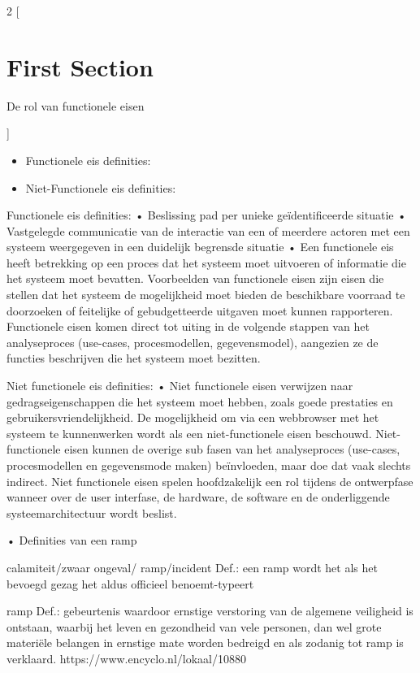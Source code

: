 \documentclass[a4paper,12pt]{article}
\begin{document}
\begin{multicols}{2}
[
\section{First Section}
De rol van functionele eisen

]

\begin{itemize}
  \item Functionele eis definities:
  \item Niet-Functionele eis definities:
\end{itemize}
Functionele eis definities:
•	Beslissing pad per unieke geïdentificeerde situatie
•	Vastgelegde communicatie van de interactie van een of meerdere actoren met een systeem weergegeven in een duidelijk begrensde situatie
•	Een functionele eis heeft betrekking op een proces dat het systeem moet uitvoeren of informatie die het systeem moet bevatten. Voorbeelden van functionele eisen zijn eisen die stellen dat het systeem de mogelijkheid moet bieden de beschikbare voorraad te doorzoeken of feitelijke of gebudgetteerde uitgaven moet kunnen rapporteren. Functionele eisen komen direct tot uiting in de volgende stappen van het analyseproces (use-cases, procesmodellen, gegevensmodel), aangezien ze de functies beschrijven die het systeem moet bezitten.


Niet functionele eis definities:
•	Niet functionele eisen verwijzen naar gedragseigenschappen die het systeem moet hebben, zoals goede prestaties en gebruikersvriendelijkheid. De mogelijkheid om via een webbrowser met het systeem te kunnenwerken wordt als een niet-functionele eisen beschouwd. Niet-functionele eisen kunnen de overige sub fasen van het analyseproces (use-cases, procesmodellen en gegevensmode maken) beïnvloeden, maar doe dat vaak slechts indirect. Niet functionele eisen spelen hoofdzakelijk een rol tijdens de ontwerpfase wanneer over de user interfase, de hardware, de software en de onderliggende systeemarchitectuur wordt beslist.



•	Definities van een ramp
 

calamiteit/zwaar ongeval/ ramp/incident
Def.: een ramp wordt het als het bevoegd gezag het aldus officieel benoemt-typeert



ramp
Def.: gebeurtenis waardoor ernstige verstoring van de algemene veiligheid is ontstaan, waarbij het leven en gezondheid van vele personen, dan wel grote materiële belangen in ernstige mate worden bedreigd en als zodanig tot ramp is verklaard.
https://www.encyclo.nl/lokaal/10880



\end{multicols}
\end{document}
